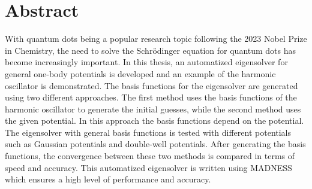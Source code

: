 \chapter*{Abstract}

With quantum dots being a popular research topic following the 2023 Nobel Prize in Chemistry, the need to solve the Schrödinger equation for quantum dots has become increasingly important. 
In this thesis, an automatized eigensolver for general one-body potentials is developed and an example of the harmonic oscillator is demonstrated.
The basis functions for the eigensolver are generated using two different approaches. 
The first method uses the basis functions of the harmonic oscillator to generate the initial guesses, while the second method uses the given potential. In this approach the basis functions depend on the potential.
The eigensolver with general basis functions is tested with different potentials such as Gaussian potentials and double-well potentials.
After generating the basis functions, the convergence between these two methods is compared in terms of speed and accuracy.
This automatized eigensolver is written using MADNESS which ensures a high level of performance and accuracy.